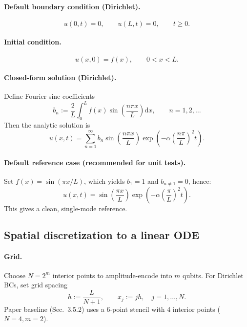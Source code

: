 \documentclass[11pt]{article}
\newcommand{\dd}{\mathrm{d}}
\begin{document}
\paragraph{Default boundary condition (Dirichlet).}
\begin{equation}
u(0,t)=0,\qquad u(L,t)=0,\qquad t\ge 0.
\end{equation}

\paragraph{Initial condition.}
\begin{equation}
u(x,0)=f(x),\qquad 0<x<L.
\end{equation}

\paragraph{Closed-form solution (Dirichlet).}
Define Fourier sine coefficients
\begin{equation}
b_n := \frac{2}{L}\int_0^L f(x)\sin\!\left(\frac{n\pi x}{L}\right)\dd x,\qquad n=1,2,\dots
\end{equation}
Then the analytic solution is
\begin{equation}
u(x,t) = \sum_{n=1}^{\infty} b_n \sin\!\left(\frac{n\pi x}{L}\right)\exp\!\left(-\alpha \left(\frac{n\pi}{L}\right)^2 t\right).
\end{equation}

\paragraph{Default reference case (recommended for unit tests).}
Set $f(x)=\sin(\pi x/L)$, which yields $b_1=1$ and $b_{n\ne 1}=0$, hence:
\begin{equation}
u(x,t)=\sin\!\left(\frac{\pi x}{L}\right)\exp\!\left(-\alpha \left(\frac{\pi}{L}\right)^2 t\right).
\end{equation}
This gives a clean, single-mode reference.

\subsection{Spatial discretization to a linear ODE}

\paragraph{Grid.}
Choose \(N=2^m\) interior points to amplitude-encode into \(m\) qubits.
For Dirichlet BCs, set grid spacing
\begin{equation}
h := \frac{L}{N+1},\qquad x_j := jh,\quad j=1,\dots,N.
\end{equation}
Paper baseline (Sec.~3.5.2) uses a 6-point stencil with 4 interior points (\(N=4,m=2\)).
\end{document}
